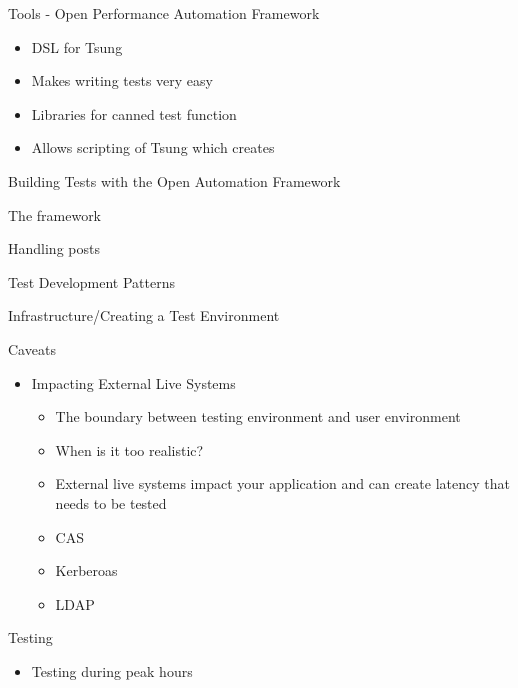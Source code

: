 \documentclass[xcolor=dvipsnames,14pt]{beamer}
\begin{document}
\begin{frame}{Tools - Open Performance Automation Framework}
  \begin{itemize}
    \item DSL for Tsung
    \item Makes writing tests very easy
    \item Libraries for canned test function
    \item Allows scripting of Tsung which creates
  \end{itemize}
\end{frame}

\begin{frame}{Building Tests with the Open Automation Framework}
  \item The framework
  \item Handling posts
\end{frame}

\begin{frame}{Test Development Patterns}
  \begin{itemize}
  \end{itemize}
\end{frame}

\begin{frame}{Infrastructure/Creating a Test Environment}
  \begin{itemize}
  \end{itemize}
\end{frame}

\begin{frame}{Caveats}
  \begin{itemize}
    \item Impacting External Live Systems
      \begin{itemize}
        \item The boundary between testing environment and user environment
        \item When is it too realistic?
        \item External live systems impact your application and can create latency that needs to be tested
        \item CAS
        \item Kerberoas
        \item LDAP
      \end{itemize}
  \end{itemize}
\end{frame}

\begin{frame}{Testing}
  \begin{itemize}
    \item Testing during peak hours
  \end{itemize}
\end{frame}
\end{document}
